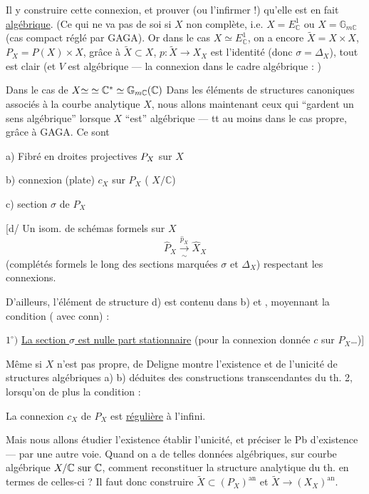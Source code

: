 Il y  construire cette connexion, et prouver (ou l'infirmer !) qu'elle est en fait \uline{algébrique}. (Ce qui ne va pas de soi si $X$ non complète, i.e. $X=E^1_{\mathbb C}$ ou $X=\mathbb G_{m\mathbb C}$ (cas compact réglé par GAGA). Or dans le cas $X\simeq E^1_{\mathbb C}$, on a encore $\widetilde X=X\times X$, $P_X=P(X)\times X$, grâce à $\widetilde X\subset X$, $p:\widetilde X\longrightarrow X_X$ est l'identité (donc $\sigma=\Delta_X$), tout est clair (et $V$ est algébrique --- la connexion dans le cadre algébrique : )

Dans le cas de $X{{\simeq}}\simeq\mathbb C^*\simeq\mathbb G_{m\mathbb C}(\mathbb C)$
Dans les éléments de structures canoniques associés à la courbe analytique $X$, nous allons  maintenant ceux qui ``gardent un sens algébrique'' lorsque $X$ ``est'' algébrique --- tt au moins dans le cas propre, grâce à GAGA.
Ce sont

a) Fibré en droites projectives ${P_X}$ sur $X$

b) connexion (plate) $c_X$ sur $P_X$ ( $X/\mathbb C$)

c) section $\sigma$ de $P_X$

[d/ Un isom. de schémas formels sur $X$
\[\widehat P_X\xrightarrow[\sim]{\widehat p_X}\widehat X_X\]
(complétés formels le long des sections marquées $\sigma$ et $\Delta_X$) respectant les connexions.

D'ailleurs, l'élément de structure d) est contenu dans b) et , moyennant la condition (  avec conn) :

$1^\circ)$ \uline{La section $\sigma$ est nulle part stationnaire} (pour la connexion donnée $c$ sur $P_X$\ldots)]

Même si $X$ n'est pas propre,  de Deligne montre l'existence et de l'unicité de structures algébriques a) b)  déduites des constructions transcendantes du th. 2, lorsqu'on  de plus la condition :

 La connexion $c_X$ de $P_X$ est \uline{régulière} à l'infini.

Mais nous allons étudier l'existence  établir l'unicité, et préciser le Pb d'existence --- par une autre voie.
Quand on a de telles données algébriques, sur courbe algébrique $X/\mathbb C{\text{ sur }\mathbb C}$, comment reconstituer la structure analytique du th. en termes de celles-ci ? Il faut donc construire  $\widetilde X\subset(P_X)^{\mathrm{an}}$ et $\widetilde X\longrightarrow(X_X)^{\mathrm{an}}$.

